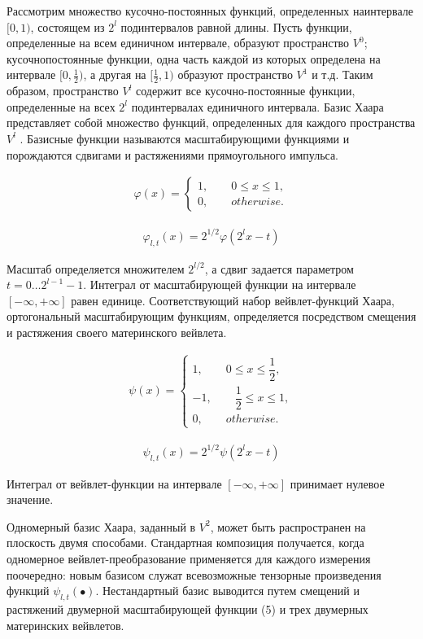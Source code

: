 \documentclass[a4paper, 12pt]{article}		%
\begin{document}
Рассмотрим множество кусочно-постоянных функций, определенных наинтервале $[0, 1)$, состоящем из $2^l$ подинтервалов равной длины. Пусть функции, определенные на всем единичном интервале, образуют пространство $V^0$; кусочнопостоянные функции, одна часть каждой из которых определена на интервале $[0, \frac{1}{2})$, а другая на $[\frac{1}{2}, 1)$ образуют пространство $V^1$ и т.д. Таким образом, пространство $V^l$ содержит все кусочно-постоянные функции, определенные на всех $2^l$ подинтервалах единичного интервала. Базис Хаара представляет собой множество функций, определенных для каждого пространства $V^l$ . Базисные функции называются масштабирующими функциями и порождаются сдвигами и растяжениями прямоугольного импульса.

\begin{gather}
\varphi(x) =
  \begin{cases}
    1,\qquad 0\le x \le 1,\\
    0,\qquad otherwise.
 \end{cases}
\end{gather}

\begin{gather}
\varphi_{l,t}(x) = 2^{1/2}\varphi(2^lx-t)
\end{gather} 

Масштаб определяется множителем $2^{l/2}$, а сдвиг задается параметром $t = 0 \ldots{} 2^{l-1} - 1$. Интеграл от масштабирующей функции на интервале $[-\infty, +\infty]$ равен единице. Соответствующий набор вейвлет-функций Хаара, ортогональный масштабирующим функциям, определяется посредством смещения и растяжения своего материнского вейвлета.

\begin{gather}
\psi(x) =
  \begin{cases}
    1,\qquad 0\le x \le \dfrac{1}{2},\\
    -1,\qquad \dfrac{1}{2}\le x \le 1,\\
    0,\qquad otherwise.
 \end{cases}
\end{gather}

\begin{gather}
\psi_{l,t}(x) = 2^{1/2}\psi(2^lx-t)
\end{gather} 

Интеграл от вейвлет-функции на интервале $[-\infty, +\infty]$ принимает нулевое значение.

Одномерный базис Хаара, заданный в $V^2$, может быть распространен на плоскость двумя способами. Стандартная композиция получается, когда одномерное вейвлет-преобразование применяется для каждого измерения поочередно: новым базисом служат всевозможные тензорные произведения функций $\psi_{l,t}(\bullet)$. Нестандартный базис выводится путем смещений и растяжений двумерной масштабирующей функции (5) и трех двумерных материнских вейвлетов.
\end{document}
